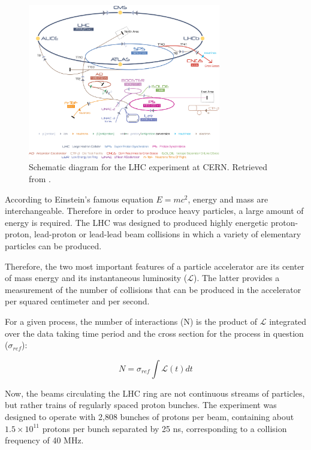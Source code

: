  \begin{figure}[H]
 	\centering
 	\includegraphics[width=0.75\textwidth]{figures/Cern-Accelerator-Complex.jpg}
 	\singlespace
 	\caption{Schematic diagram for the LHC experiment at CERN. Retrieved from \cite{LHC-schematic}.}
 	\label{fig:lhcdia}
 \end{figure}

 According to Einstein's famous equation $E=mc^{2}$, energy and mass are interchangeable. Therefore in order to produce heavy particles, a large amount of energy is required. The LHC was designed to produced highly energetic proton-proton, lead-proton or lead-lead beam collisions in which a variety of elementary particles can be produced.

 Therefore, the two most important features of a particle accelerator are its center of mass energy and its instantaneous luminosity ($\mathcal{L}$). The latter provides a measurement of the number of collisions that can be produced in the accelerator per squared centimeter and per second.

For a given process, the number of interactions (N) is the product of $\mathcal{L}$ integrated over the data taking time period and the cross section for the process in question ($\sigma_{ref}$):

\begin{equation}
N = \sigma_{ref}\int\mathcal{L}(t)dt
\end{equation} 

Now, the beams circulating the LHC ring are not continuous streams of particles, but rather trains of regularly spaced proton bunches. The experiment was designed to operate with 2,808 bunches of protons per beam, containing about $1.5\times10^{11}$ protons per bunch separated by 25 ns, corresponding to a collision frequency of 40 MHz. 

